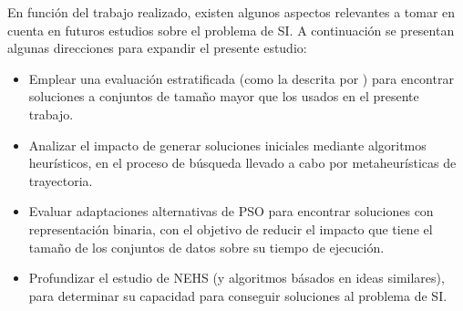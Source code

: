 En función del trabajo realizado, existen algunos aspectos relevantes a tomar en cuenta en futuros estudios sobre el problema de SI. A continuación se presentan algunas direcciones para expandir el presente estudio:

\begin{itemize}
\item Emplear una evaluación estratificada (como la descrita por \cite{cano2003using}) para encontrar soluciones a conjuntos de tamaño mayor que los usados en el presente trabajo.
\item Analizar el impacto de generar soluciones iniciales mediante algoritmos heurísticos, en el proceso de búsqueda llevado a cabo por metaheurísticas de trayectoria.
\item Evaluar adaptaciones alternativas de PSO para encontrar soluciones con representación binaria, con el objetivo de reducir el impacto que tiene el tamaño de los conjuntos de datos sobre su tiempo de ejecución.
\item Profundizar el estudio de NEHS (y algoritmos básados en ideas similares), para determinar su capacidad para conseguir soluciones al problema de SI.
\end{itemize}
